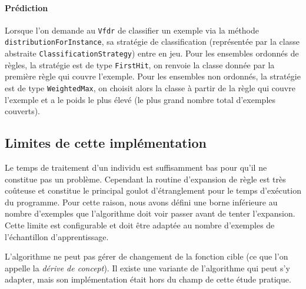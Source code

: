         \paragraph{Prédiction} Lorsque l’on demande au \texttt{Vfdr} de classifier un exemple via la méthode \texttt{distributionForInstance}, sa stratégie de classification (représentée par la classe abstraite \texttt{ClassificationStrategy}) entre en jeu. Pour les ensembles ordonnés de règles, la stratégie est de type \texttt{FirstHit}, on renvoie la classe donnée par la première règle qui couvre l’exemple. Pour les ensembles non ordonnés, la stratégie est de type \texttt{WeightedMax}, on choisit alors la classe à partir de la règle qui couvre l’exemple et a le poids le plus élevé (le plus grand nombre total d’exemples couverts).

    \subsection{Limites de cette implémentation}

        Le temps de traitement d'un individu est suffisamment bas pour qu'il ne constitue pas un problème. Cependant la routine d'expansion de règle est très coûteuse et constitue le principal goulot d'étranglement pour le temps d'exécution du programme. Pour cette raison, nous avons défini une borne inférieure au nombre d'exemples que l'algorithme doit voir passer avant de tenter l'expansion. Cette limite est configurable et doit être adaptée au nombre d'exemples de l'échantillon d'apprentissage.

        L’algorithme ne peut pas gérer de changement de la fonction cible (ce que l'on appelle la \emph{dérive de concept}). Il existe une variante de l'algorithme qui peut s'y adapter, mais son implémentation était hors du champ de cette étude pratique.

